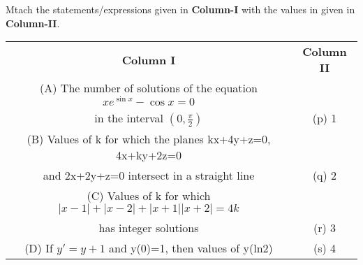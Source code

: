 \item Mtach the statements/expressions given in \textbf{Column-I} with the values in given in \textbf{Column-II}.
\begin{table}[ht!]
\centering
\begin{tabular}{c c} 
 \textbf{Column I} & \textbf{Column II}\\ [0.5ex] 
 (A) The number of solutions of the equation
     $xe^{\sin x}-\cos x=0$\\
     in the interval $(0, \frac{\pi}{2})$                   &(p) 1\\ 
 (B) Values of k for which the planes
      kx+4y+z=0, 4x+ky+2z=0\\ and 2x+2y+z=0
      intersect in a straight line                          &(q) 2\\
 (C) Values of k for which
     $|x-1|+|x-2|+|x+1||x+2|=4k$\\
     has integer solutions                                  &(r) 3\\
 (D) If $y'=y+1$ and y(0)=1,
     then values of y(ln2)                                  &(s) 4\\[1ex]
                                                            
\end{tabular}
\end{table}

